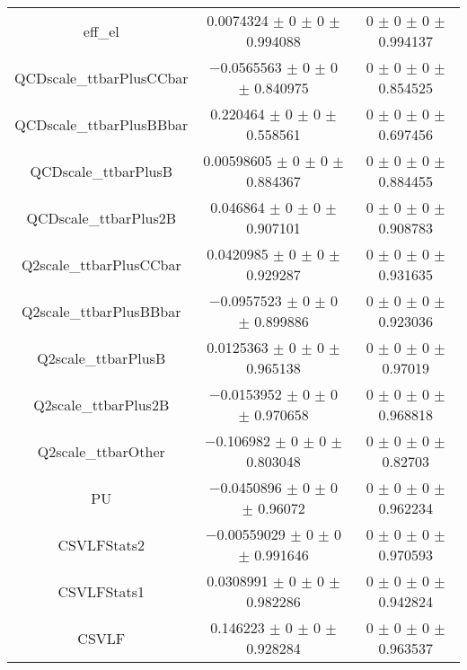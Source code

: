 \begin{table}
\begin{tabular}{ccc}
eff\_el 	& \num{0.0074324} $\pm$ \num{0} $\pm$ \num{0} $\pm$ \num{0.994088} 	& \num{0} $\pm$ \num{0} $\pm$ \num{0} $\pm$ \num{0.994137}\\
QCDscale\_ttbarPlusCCbar 	& \num{-0.0565563} $\pm$ \num{0} $\pm$ \num{0} $\pm$ \num{0.840975} 	& \num{0} $\pm$ \num{0} $\pm$ \num{0} $\pm$ \num{0.854525}\\
QCDscale\_ttbarPlusBBbar 	& \num{0.220464} $\pm$ \num{0} $\pm$ \num{0} $\pm$ \num{0.558561} 	& \num{0} $\pm$ \num{0} $\pm$ \num{0} $\pm$ \num{0.697456}\\
QCDscale\_ttbarPlusB 	& \num{0.00598605} $\pm$ \num{0} $\pm$ \num{0} $\pm$ \num{0.884367} 	& \num{0} $\pm$ \num{0} $\pm$ \num{0} $\pm$ \num{0.884455}\\
QCDscale\_ttbarPlus2B 	& \num{0.046864} $\pm$ \num{0} $\pm$ \num{0} $\pm$ \num{0.907101} 	& \num{0} $\pm$ \num{0} $\pm$ \num{0} $\pm$ \num{0.908783}\\
Q2scale\_ttbarPlusCCbar 	& \num{0.0420985} $\pm$ \num{0} $\pm$ \num{0} $\pm$ \num{0.929287} 	& \num{0} $\pm$ \num{0} $\pm$ \num{0} $\pm$ \num{0.931635}\\
Q2scale\_ttbarPlusBBbar 	& \num{-0.0957523} $\pm$ \num{0} $\pm$ \num{0} $\pm$ \num{0.899886} 	& \num{0} $\pm$ \num{0} $\pm$ \num{0} $\pm$ \num{0.923036}\\
Q2scale\_ttbarPlusB 	& \num{0.0125363} $\pm$ \num{0} $\pm$ \num{0} $\pm$ \num{0.965138} 	& \num{0} $\pm$ \num{0} $\pm$ \num{0} $\pm$ \num{0.97019}\\
Q2scale\_ttbarPlus2B 	& \num{-0.0153952} $\pm$ \num{0} $\pm$ \num{0} $\pm$ \num{0.970658} 	& \num{0} $\pm$ \num{0} $\pm$ \num{0} $\pm$ \num{0.968818}\\
Q2scale\_ttbarOther 	& \num{-0.106982} $\pm$ \num{0} $\pm$ \num{0} $\pm$ \num{0.803048} 	& \num{0} $\pm$ \num{0} $\pm$ \num{0} $\pm$ \num{0.82703}\\
PU 	& \num{-0.0450896} $\pm$ \num{0} $\pm$ \num{0} $\pm$ \num{0.96072} 	& \num{0} $\pm$ \num{0} $\pm$ \num{0} $\pm$ \num{0.962234}\\
CSVLFStats2 	& \num{-0.00559029} $\pm$ \num{0} $\pm$ \num{0} $\pm$ \num{0.991646} 	& \num{0} $\pm$ \num{0} $\pm$ \num{0} $\pm$ \num{0.970593}\\
CSVLFStats1 	& \num{0.0308991} $\pm$ \num{0} $\pm$ \num{0} $\pm$ \num{0.982286} 	& \num{0} $\pm$ \num{0} $\pm$ \num{0} $\pm$ \num{0.942824}\\
CSVLF 	& \num{0.146223} $\pm$ \num{0} $\pm$ \num{0} $\pm$ \num{0.928284} 	& \num{0} $\pm$ \num{0} $\pm$ \num{0} $\pm$ \num{0.963537}\\

\end{tabular}
\end{table}
